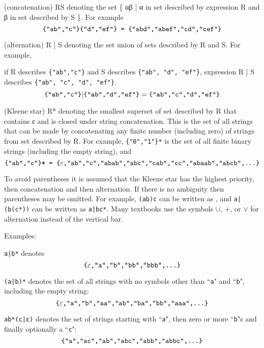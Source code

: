 \begin{compactitem}
\item (\textsf{concatenation}) RS denoting the set \{ αβ | α in set described by expression R and β in set described by S \}. For example $$\text{\texttt{\{"ab","c"\}\{"d","ef"\} = \{"abd","abef","cd","cef"\}}}$$
\item (\textsf{alternation}) R | S denoting the set union of sets described by R and S. For example, 

if R describes \texttt{\{"ab","c"\}} and S describes \texttt{\{"ab", "d", "ef"\}}, expression R | S describes \texttt{\{"ab", "c", "d", "ef"\}}.$$\text{\texttt{\{"ab","c"\}}|\texttt{\{"ab","d","ef"\}}}=\texttt{\{"ab","c","d","ef"\}}$$
\item (\textsf{Kleene star}) R* denoting the smallest superset of set described by R that contains ε and is closed under string concatenation. This is the set of all strings that can be made by concatenating any finite number (including zero) of strings from set described by R. For example, \texttt{\{"0","1"\}*} is the set of all finite binary strings (including the empty string), and 
$$\text{\texttt{\{"ab","c"\}* = \{}} \varepsilon \text{\texttt{,"ab","c","abab","abc","cab","cc","abaab","abcb",...\}}}$$
\end{compactitem}

To avoid parentheses it is assumed that the Kleene star has the highest priority, then concatenation and then alternation. If there is no ambiguity then parentheses may be omitted. For example, \texttt{(ab)c} can be written as , and \texttt{a|(b(c*))} can be written as \texttt{a|bc*}. Many textbooks use the symbols $\cup$, $+$, or $\vee$ for alternation instead of the vertical bar.

Examples:

\begin{compactitem}
\item \texttt{a|b*} denotes $$\text{\texttt{\{}} \varepsilon \text{\texttt{,"a","b","bb","bbb",...\}}}$$
\item \texttt{(a|b)*} denotes the set of all strings with no symbols other than ``\texttt{a}" and ``\texttt{b}", including the empty string: $$\text{\texttt{\{}} \varepsilon \text{\texttt{,"a","b","aa","ab","ba","bb","aaa",...\}}}$$
\item \texttt{ab*(c|ε)} denotes the set of strings starting with ``\texttt{a}", then zero or more ``\texttt{b}"s and finally optionally a ``\texttt{c}": $$\text{\texttt{\{"a","ac","ab","abc","abb","abbc",...\}}}$$

\end{compactitem}




